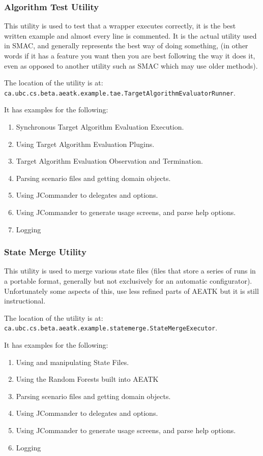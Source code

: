 \documentclass[11pt,letterpaper,oneside]{article}
\begin{document}
\subsubsection{Algorithm Test Utility}

This utility is used to test that a wrapper executes correctly, it is the best written example and almost every line is commented. It is the actual utility used in SMAC, and generally represents the best way of doing something, (in other words if it has a feature you want then you are best following the way it does it, even as opposed to another utility such as SMAC which may use older methods).

The location of the utility is at:\\ \texttt{ca.ubc.cs.beta.aeatk.example.tae.TargetAlgorithmEvaluatorRunner}.

It has examples for the following:

\begin{enumerate}
\item Synchronous Target Algorithm Evaluation Execution.
\item Using Target Algorithm Evaluation Plugins.
\item Target Algorithm Evaluation Observation and Termination.
\item Parsing scenario files and getting domain objects.
\item Using JCommander to delegates and options.
\item Using JCommander to generate usage screens, and parse help options.
\item Logging
\end{enumerate}

\subsubsection{State Merge Utility}

This utility is used to merge various state files (files that store a series of runs in a portable format, generally but not exclusively for an automatic configurator). Unfortunately some aspects of this, use less refined parts of AEATK but it is still instructional.


The location of the utility is at:\\ \texttt{ca.ubc.cs.beta.aeatk.example.statemerge.StateMergeExecutor}.

It has examples for the following:

\begin{enumerate}
\item Using and manipulating State Files.
\item Using the Random Forests built into AEATK
\item Parsing scenario files and getting domain objects.
\item Using JCommander to delegates and options.
\item Using JCommander to generate usage screens, and parse help options.
\item Logging
\end{enumerate}
\end{document}
